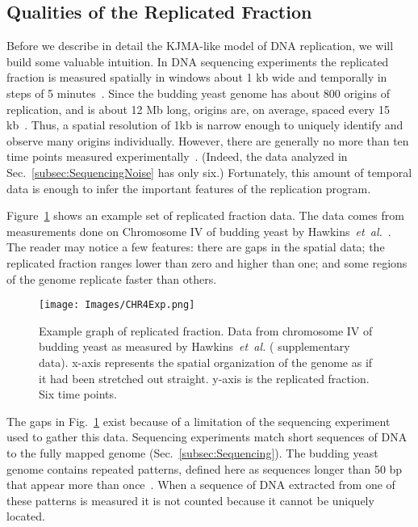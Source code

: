 	
		\subsection{Qualities of the Replicated Fraction}
		\label{subsec:QualitiesReplicatedFraction}
		
		Before we describe in detail the KJMA-like model of DNA replication, we will build some valuable intuition.
		In DNA sequencing experiments the replicated fraction is measured spatially in windows about 1 kb wide and temporally in steps of 5 minutes~\cite{StochasticTermination}.
		Since the budding yeast genome has about 800 origins of replication, and is about 12 Mb long, origins are, on average, spaced every 15 kb~\cite{OriDB,BuddingYeastSequence}.
		Thus, a spatial resolution of 1kb is narrow enough to uniquely identify and observe many origins individually. 
		However, there are generally no more than ten time points measured experimentally~\cite{StochasticTermination,DeepSeq,McCuneMicroArray}.
		(Indeed, the data analyzed in Sec.~\ref{subsec:SequencingNoise} has only six.)
		Fortunately, this amount of temporal data is enough to infer the important features of the replication program.
		
		Figure~\ref{fig:ReplicatedFractionExample} shows an example set of replicated fraction data.
		The data comes from measurements done on Chromosome IV of budding yeast by Hawkins~\emph{et~al.}~\cite{StochasticTermination}.
		The reader may notice a few features:
		there are gaps in the spatial data;
		the replicated fraction ranges lower than zero and higher than one;
		and some regions of the genome replicate faster than others.
		
		\begin{figure}[tbh]
			\begin{center}
				\texttt{[image: Images/CHR4Exp.png]}
			\end{center}
				\caption[Replicated Fraction of Chromosome IV of Budding Yeast]{\label{fig:ReplicatedFractionExample} Example graph of replicated fraction.
					Data from chromosome IV of budding yeast as measured by Hawkins~\emph{et~al.} (\cite{StochasticTermination} supplementary data).
					x-axis represents the spatial organization of the genome as if it had been stretched out straight.
					y-axis is the replicated fraction.
					Six time points.
				}
		\end{figure}
		
		The gaps in Fig.~\ref{fig:ReplicatedFractionExample} exist because of a limitation of the sequencing experiment used to gather this data.
		Sequencing experiments match short sequences of DNA to the fully mapped genome (Sec.~\ref{subsec:Sequencing}).
		The budding yeast genome contains repeated patterns, defined here as sequences longer than 50 bp that appear more than once~\cite{Repeats}.
		When a sequence of DNA extracted from one of these patterns is measured it is not counted because it cannot be uniquely located.
		
